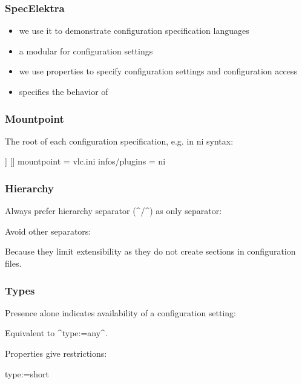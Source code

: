 \begin{frame}
	\frametitle{SpecElektra}

	\begin{itemize}
	\item we use it to demonstrate configuration specification languages
	\item a modular  for configuration settings
	\item we use properties to specify configuration settings and configuration access
	\item {} specifies the behavior of \elektra{}
	\end{itemize}
\end{frame}


\begin{frame}[fragile]
	\frametitle{Mountpoint}

	The root of each configuration specification, e.g. in ni syntax:

	\begin{code}[morekeywords={mountpoint,infos,plugins},gobble=4]]
	[]
	mountpoint = vlc.ini
	infos/plugins = ni
	\end{code}
\end{frame}

\begin{frame}[fragile]
	\frametitle{Hierarchy}

	Always prefer hierarchy separator (^/^) as only separator:

	\begin{code}[gobble=4]
	[server/ip]
	\end{code}

	\vspace{1cm}

	Avoid other separators:

	\begin{code}[gobble=4]
	[server_ip]
	[server-ip]
	[server.ip]
	\end{code}

	Because they limit extensibility
	as they do not create sections in configuration files.
\end{frame}

\begin{frame}[fragile]
	\frametitle{Types}

	Presence alone indicates availability of a configuration setting:

	\begin{code}
	\end{code}

	Equivalent to ^type:=any^.

	\vspace{1cm}

	Properties give restrictions:

	\begin{code}
	type:=short
	\end{code}
\end{frame}

